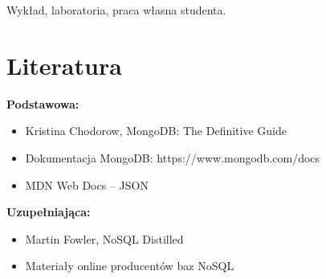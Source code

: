 \documentclass[12pt, a4paper]{article}
\begin{document}
Wykład, laboratoria, praca własna studenta.

\section{Literatura}

\textbf{Podstawowa:}
\begin{itemize}
  \item Kristina Chodorow, MongoDB: The Definitive Guide
  \item Dokumentacja MongoDB: https://www.mongodb.com/docs
  \item MDN Web Docs – JSON
\end{itemize}

\textbf{Uzupełniająca:}
\begin{itemize}
  \item Martin Fowler, NoSQL Distilled
  \item Materiały online producentów baz NoSQL
\end{itemize}
\end{document}
